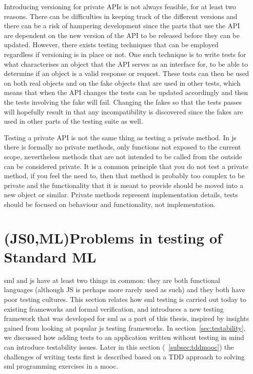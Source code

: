 \documentclass[11pt]{article}
\begin{document}
Introducing versioning for private APIs is not always feasible, for at least two reasons. There can be difficulties in keeping track of the different versions and there can be a risk of hampering development since the parts that use the API are dependent on the new version of the API to be released before they can be updated. However, there exists testing techniques that can be employed regardless if versioning is in place or not. One such technique is to write tests for what characterises an object that the API serves as an interface for, to be able to determine if an object is a valid response or request. These tests can then be used on both real objects and on the fake objects that are used in other tests, which means that when the API changes the tests can be updated accordingly and then the tests involving the fake will fail. Changing the fakes so that the tests passes will hopefully result in that any incompatibility is discovered since the fakes are used in other parts of the testing suite as well. \cite[question~34]{Edelstam}

Testing a private API is not the same thing as testing a private method. In \gls{js} there is formally no private methods, only functions not exposed to the current scope, nevertheless methods that are not intended to be called from the outside can be considered private. It is a common principle that you do not test a private method, if you feel the need to, then that method is probably too complex to be private and the functionality that it is meant to provide should be moved into a new object or similar. Private methods represent implementation details, tests should be focused on behaviour and functionality, not implementation. \cite[questions~62-63]{Edelstam}

\section{(JS0,ML)Problems in testing of Standard ML}

\Gls{sml} and \gls{js} have at least two things in common: they are both functional languages (although JS is perhaps more rarely used as such) and they both have poor testing cultures. This section relates how \gls{sml} testing is carried out today to existing frameworks and formal verification, and introduces a new testing framework that was developed for \gls{sml} as a part of this thesis, inspired by insights gained from looking at popular \gls{js} testing frameworks. In section~\ref{sec:testability}, we discussed how adding tests to an application written without testing in mind can introduce testability issues. Later in this section (~\ref{subsec:tddmooc}) the challenges of writing tests first is described based on a TDD approach to solving \gls{sml} programming exercises in a \gls{mooc}.
\end{document}
